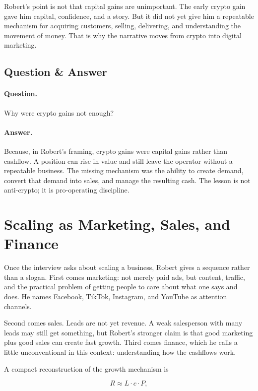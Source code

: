 Robert's point is not that capital gains are unimportant. The early crypto gain gave him capital, confidence, and a story. But it did not yet give him a repeatable mechanism for acquiring customers, selling, delivering, and understanding the movement of money. That is why the narrative moves from crypto into digital marketing.

\subsection{Question \& Answer}

\paragraph{Question.} Why were crypto gains not enough?

\paragraph{Answer.} Because, in Robert's framing, crypto gains were capital gains rather than cashflow. A position can rise in value and still leave the operator without a repeatable business. The missing mechanism was the ability to create demand, convert that demand into sales, and manage the resulting cash. The lesson is not anti-crypto; it is pro-operating discipline.

\section{Scaling as Marketing, Sales, and Finance}

Once the interview asks about scaling a business, Robert gives a sequence rather than a slogan. First comes marketing: not merely paid ads, but content, traffic, and the practical problem of getting people to care about what one says and does. He names Facebook, TikTok, Instagram, and YouTube as attention channels.

Second comes sales. Leads are not yet revenue. A weak salesperson with many leads may still get something, but Robert's stronger claim is that good marketing plus good sales can create fast growth. Third comes finance, which he calls a little unconventional in this context: understanding how the cashflows work.

A compact reconstruction of the growth mechanism is

\begin{equation}
R \approx L \cdot c \cdot P,
\end{equation}

